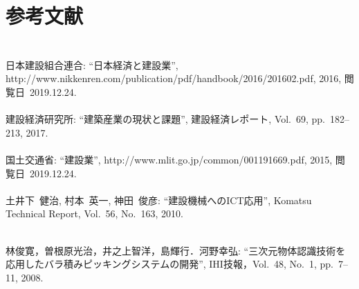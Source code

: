 \chapter*{参考文献}
\lhead[参考文献]{}
\thispagestyle{empty}

\newpage

\subsection*{}
\begin{mythebibliography}{}

\leavevmode \\日本建設組合連合:
\newblock ``日本経済と建設業'',
\newblock http://www.nikkenren.com/publication/pdf/handbook/2016/201602.pdf, 2016, 閲覧日~2019.12.24.
\\

\leavevmode \\建設経済研究所:
\newblock ``建築産業の現状と課題'',
\newblock 建設経済レポート, Vol.~69, pp.~182--213, 2017.
\\
\leavevmode \\国土交通省:
\newblock ``建設業'',
\newblock http://www.mlit.go.jp/common/001191669.pdf, 2015, 閲覧日~2019.12.24.
\\
\leavevmode \\土井下~健治, 村本~英一, 神田~俊彦:
\newblock ``建設機械へのICT応用'',
\newblock Komatsu Technical Report, Vol.~56, No.~163, 2010.
\\
\newpage

\leavevmode \\林俊寛，曽根原光治，井之上智洋，島輝行．河野幸弘:
\newblock ``三次元物体認識技術を応用したバラ積みピッキングシステムの開発'',
\newblock IHI技報，Vol.~48, No.~1, pp.~7--11, 2008.
\\

%


\end{mythebibliography}
